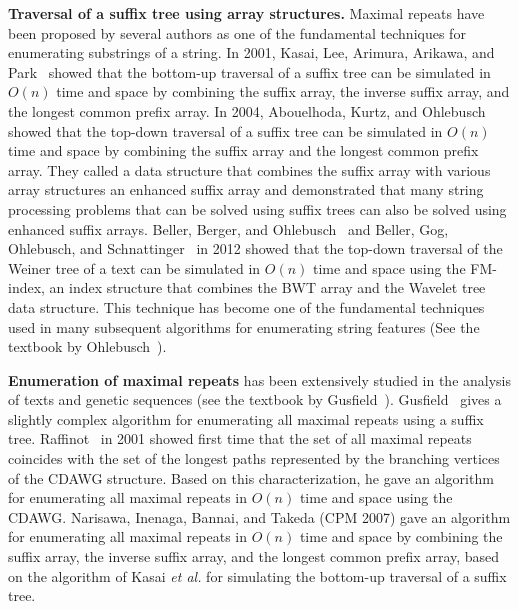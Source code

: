 \textbf{Traversal of a suffix tree using array structures.} Maximal repeats have been proposed by several authors as one of the fundamental techniques for enumerating substrings of a string. In 2001, Kasai, Lee, Arimura, Arikawa, and Park~\cite{kasai:lee2001lcp:linear} showed that the bottom-up traversal of a suffix tree can be simulated in $O(n)$ time and space by combining the suffix array, the inverse suffix array, and the longest common prefix array. In 2004, Abouelhoda, Kurtz, and Ohlebusch~\cite{abouelhoda2004replacing} showed that the top-down traversal of a suffix tree can be simulated in $O(n)$ time and space by combining the suffix array and the longest common prefix array. They called a data structure that combines the suffix array with various array structures an enhanced suffix array and demonstrated that many string processing problems that can be solved using suffix trees can also be solved using enhanced suffix arrays.
Beller, Berger, and Ohlebusch~\cite{beller:berger2012space:efficient:bbo} and Beller, Gog, Ohlebusch, and Schnattinger~\cite{bellergogohlebusch2013computing} in 2012 showed that the top-down traversal of the Weiner tree of a text can be simulated in $O(n)$ time and space using the FM-index, an index structure that combines the BWT array and the Wavelet tree data structure. This technique has become one of the fundamental techniques used in many subsequent algorithms for enumerating string features (See the textbook by Ohlebusch~\cite{ohlebusch2013bookbioinfo}).

\textbf{Enumeration of maximal repeats} has been extensively studied in the analysis of texts and genetic sequences (see the textbook by Gusfield~\cite{gusfield1997algorithms}). Gusfield~\cite[Section 7.12.1]{gusfield1997algorithms} gives a slightly complex algorithm for enumerating all maximal repeats using a suffix tree.
Raffinot~\cite{raffinot2001maximal} in 2001 showed first time that the set of all maximal repeats coincides with the set of the longest paths represented by the branching vertices of the CDAWG structure. Based on this characterization, he gave an algorithm for enumerating all maximal repeats in $O(n)$ time and space using the CDAWG.
Narisawa, Inenaga, Bannai, and Takeda (CPM 2007) gave an algorithm for enumerating all maximal repeats in $O(n)$ time and space by combining the suffix array, the inverse suffix array, and the longest common prefix array, based on the algorithm of Kasai \textit{et al.} for simulating the bottom-up traversal of a suffix tree.

